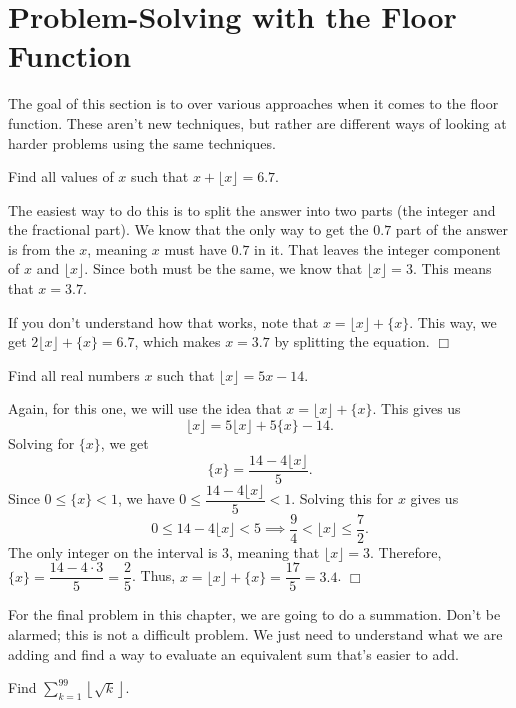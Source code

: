 \documentclass[lang=en,11pt]{elegantbook}
\begin{document}
\section{Problem-Solving with the Floor Function}
\noindent The goal of this section is to over various approaches when it comes to the floor function.  These aren't new techniques, but rather are different ways of looking at harder problems using the same techniques.
\begin{example}
Find all values of $x$ such that $x+\lfloor{x}\rfloor=6.7$.
\end{example}
\begin{solution}
The easiest way to do this is to split the answer into two parts (the integer and the fractional part). We know that the only way to get the $0.7$ part of the answer is from the $x$, meaning $x$ must have $0.7$ in it.  That leaves the integer component of $x$ and $\lfloor{x}\rfloor$.  Since both must be the same, we know that $\lfloor{x}\rfloor=3$.  This means that $x=3.7$.

If you don't understand how that works, note that $x=\lfloor{x}\rfloor+\{x\}$.  This way, we get $2\lfloor{x}\rfloor+\{x\}=6.7$, which makes $x=3.7$ by splitting the equation. $\Box$
\end{solution}
\begin{example}
Find all real numbers $x$ such that $\lfloor{x}\rfloor=5x-14$.
\end{example}
\begin{solution}
Again, for this one, we will use the idea that $x=\lfloor{x}\rfloor+\{x\}$.  This gives us $$\lfloor{x}\rfloor=5\lfloor{x}\rfloor+5\{x\}-14.$$  Solving for $\{x\}$, we get $$\{x\}=\dfrac{14-4\lfloor{x}\rfloor}{5}.$$  Since $0\leq \{x\}<1$, we have $0\leq \dfrac{14-4\lfloor{x}\rfloor}{5}<1$.  Solving this for $x$ gives us $$0\leq 14-4\lfloor{x}\rfloor<5 \implies \dfrac{9}{4}<\lfloor{x}\rfloor\leq \dfrac{7}{2}.$$  The only integer on the interval is $3$, meaning that $\lfloor{x}\rfloor=3$.  Therefore, $\{x\}=\dfrac{14-4\cdot 3}{5}=\dfrac{2}{5}$.  Thus, $x=\lfloor{x}\rfloor+\{x\}=\dfrac{17}{5}=3.4$. $\Box$
\end{solution}
For the final problem in this chapter, we are going to do a summation.  Don't be alarmed; this is not a difficult problem.  We just need to understand what we are adding and find a way to evaluate an equivalent sum that's easier to add.
\begin{example}
Find $\displaystyle \sum_{k=1}^{99}{\left\lfloor{\sqrt{k}}\right\rfloor}$.
\end{example}
\end{document}
